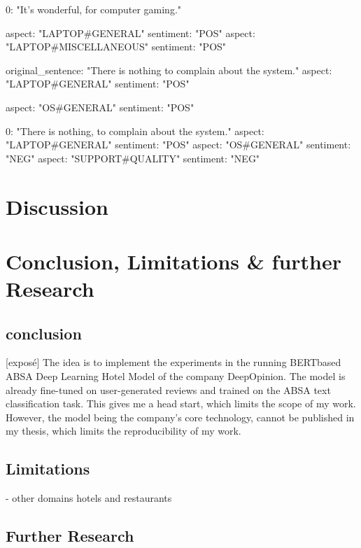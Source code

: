 0: "It's wonderful, for computer gaming."


aspect: "LAPTOP#GENERAL"
sentiment: "POS"
aspect: "LAPTOP#MISCELLANEOUS"
sentiment: "POS"



original_sentence: "There is nothing to complain about the system."
aspect: "LAPTOP#GENERAL"
sentiment: "POS"

    aspect: "OS#GENERAL"
    sentiment: "POS"

0: "There is nothing, to complain about the system."
aspect: "LAPTOP#GENERAL"
sentiment: "POS"
aspect: "OS#GENERAL"
sentiment: "NEG"
aspect: "SUPPORT#QUALITY"
sentiment: "NEG"

\section{Discussion}

\section{Conclusion, Limitations \& further Research}

\subsection{conclusion}
[exposé]
The idea is to implement the experiments in the running BERTbased ABSA Deep Learning Hotel Model of the company DeepOpinion. The model is already fine-tuned on user-generated reviews and trained on the ABSA text classification task. This gives me a head start, which limits the scope of my work. However, the model being the company's core technology, cannot be published in my thesis, which limits the reproducibility of my work.


\subsection{Limitations}

- other domains hotels and restaurants


\subsection{Further Research}





\FloatBarrier


